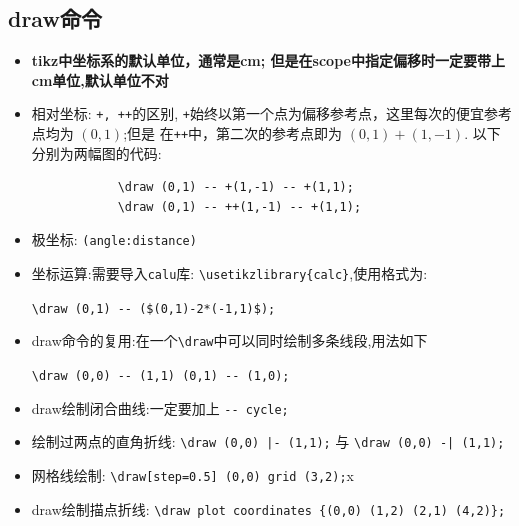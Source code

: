 \documentclass[12pt]{article}
\begin{document}
\subsection{draw命令}
\begin{itemize}
    \item \textbf{tikz中坐标系的默认单位，通常是cm; 但是在scope中指定偏移时一定要带上cm单位,默认单位不对}
    \item 相对坐标: \verb|+, ++|的区别, \verb|+|始终以第一个点为偏移参考点，这里每次的便宜参考点均为 $(0, 1)$;但是
        在\verb|++|中，第二次的参考点即为 $(0, 1)+(1, -1)$. 以下分别为两幅图的代码:
        \begin{verbatim}
            \draw (0,1) -- +(1,-1) -- +(1,1);
            \draw (0,1) -- ++(1,-1) -- +(1,1);
        \end{verbatim}
        \begin{center}
            \hspace*{8em}
        \end{center}
    \item 极坐标: \verb|(angle:distance)|
    \item 坐标运算:需要导入\verb|calu|库: \verb|\usetikzlibrary{calc}|,使用格式为:\par
        \verb|\draw (0,1) -- ($(0,1)-2*(-1,1)$);|
    \item draw命令的复用:在一个\verb|\draw|中可以同时绘制多条线段,用法如下\par
        \verb|\draw (0,0) -- (1,1) (0,1) -- (1,0);|
    \item draw绘制闭合曲线:一定要加上 \verb|-- cycle;| 
    \item 绘制过两点的直角折线: \verb!\draw (0,0) |- (1,1);! 与 \verb!\draw (0,0) -| (1,1);!
        \begin{center}
            \hspace*{8em}
        \end{center}
    \item 网格线绘制: \verb|\draw[step=0.5] (0,0) grid (3,2);|x
    \item draw绘制描点折线: \verb|\draw plot coordinates {(0,0) (1,2) (2,1) (4,2)};|
\end{itemize}
\end{document}
